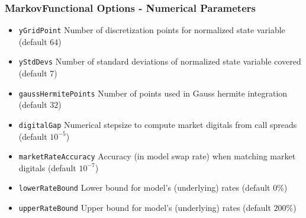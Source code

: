\documentclass{beamer}
\begin{document}

\begin{frame}[fragile]
\frametitle{MarkovFunctional Options - Numerical Parameters}
\begin{itemize}
\item \verb+yGridPoint+ Number of discretization points for normalized state variable (default $64$)
\item \verb+yStdDevs+ Number of standard deviations of normalized state variable covered (default $7$)
\item \verb+gaussHermitePoints+ Number of points used in Gauss hermite integration (default $32$)
\item \verb+digitalGap+ Numerical stepsize to compute market digitals from call spreads (default $10^{-5}$)
\item \verb+marketRateAccuracy+ Accuracy (in model swap rate) when matching market digitals (default $10^{-7}$)
\item \verb+lowerRateBound+ Lower bound for model's (underlying) rates (default $0\%$)
\item \verb+upperRateBound+ Upper bound for model's (underlying) rates (default $200\%$)
\end{itemize}
\end{frame}
\end{document}
